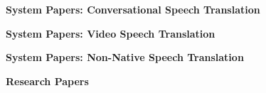 \vspace{1ex}
\item[] {\bfseries System Papers: Conversational Speech Translation}
\item[$\bullet$] 
\item[$\bullet$] 

\vspace{1ex}
\item[] {\bfseries System Papers: Video Speech Translation}
\item[$\bullet$] 

\vspace{1ex}
\item[] {\bfseries System Papers: Non-Native Speech Translation}
\item[$\bullet$] 
\item[$\bullet$] 

\vspace{1ex}
\item[] {\bfseries Research Papers}
\item[$\bullet$] 
\item[$\bullet$] 
\item[$\bullet$] 
\item[$\bullet$] 
\item[$\bullet$] 
\item[$\bullet$] 
\item[$\bullet$] 
\item[$\bullet$] 
\item[$\bullet$] 
